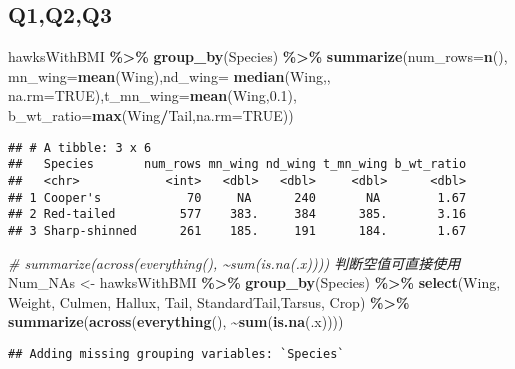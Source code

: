 \documentclass[
]{article}
\newenvironment{Shaded}{\begin{snugshade}}{\end{snugshade}}
\newcommand{\AttributeTok}[1]{\textcolor[rgb]{0.13,0.29,0.53}{#1}}
\newcommand{\CommentTok}[1]{\textcolor[rgb]{0.56,0.35,0.01}{\textit{#1}}}
\newcommand{\ConstantTok}[1]{\textcolor[rgb]{0.56,0.35,0.01}{#1}}
\newcommand{\FloatTok}[1]{\textcolor[rgb]{0.00,0.00,0.81}{#1}}
\newcommand{\FunctionTok}[1]{\textcolor[rgb]{0.13,0.29,0.53}{\textbf{#1}}}
\newcommand{\NormalTok}[1]{#1}
\newcommand{\OtherTok}[1]{\textcolor[rgb]{0.56,0.35,0.01}{#1}}
\newcommand{\SpecialCharTok}[1]{\textcolor[rgb]{0.81,0.36,0.00}{\textbf{#1}}}
\begin{document}
\hypertarget{q1q2q3}{%
\subsection{Q1,Q2,Q3}\label{q1q2q3}}

\begin{Shaded}
\begin{Highlighting}[]
\NormalTok{ hawksWithBMI }\SpecialCharTok{\%\textgreater{}\%} 
  \FunctionTok{group\_by}\NormalTok{(Species) }\SpecialCharTok{\%\textgreater{}\%}
   \FunctionTok{summarize}\NormalTok{(}\AttributeTok{num\_rows=}\FunctionTok{n}\NormalTok{(), }\AttributeTok{mn\_wing=}\FunctionTok{mean}\NormalTok{(Wing),}\AttributeTok{nd\_wing=} \FunctionTok{median}\NormalTok{(Wing,, }\AttributeTok{na.rm=}\ConstantTok{TRUE}\NormalTok{),}\AttributeTok{t\_mn\_wing=}\FunctionTok{mean}\NormalTok{(Wing,}\FloatTok{0.1}\NormalTok{), }\AttributeTok{b\_wt\_ratio=}\FunctionTok{max}\NormalTok{(Wing}\SpecialCharTok{/}\NormalTok{Tail,}\AttributeTok{na.rm=}\ConstantTok{TRUE}\NormalTok{))}
\end{Highlighting}
\end{Shaded}

\begin{verbatim}
## # A tibble: 3 x 6
##   Species       num_rows mn_wing nd_wing t_mn_wing b_wt_ratio
##   <chr>            <int>   <dbl>   <dbl>     <dbl>      <dbl>
## 1 Cooper's            70     NA      240       NA        1.67
## 2 Red-tailed         577    383.     384      385.       3.16
## 3 Sharp-shinned      261    185.     191      184.       1.67
\end{verbatim}

\begin{Shaded}
\begin{Highlighting}[]
\CommentTok{\# summarize(across(everything(), \textasciitilde{}sum(is.na(.x)))) 判断空值可直接使用}
\NormalTok{Num\_NAs }\OtherTok{\textless{}{-}}\NormalTok{ hawksWithBMI }\SpecialCharTok{\%\textgreater{}\%} \FunctionTok{group\_by}\NormalTok{(Species) }\SpecialCharTok{\%\textgreater{}\%} \FunctionTok{select}\NormalTok{(Wing, Weight, Culmen, Hallux, Tail, StandardTail,Tarsus, Crop) }\SpecialCharTok{\%\textgreater{}\%} \FunctionTok{summarize}\NormalTok{(}\FunctionTok{across}\NormalTok{(}\FunctionTok{everything}\NormalTok{(), }\SpecialCharTok{\textasciitilde{}}\FunctionTok{sum}\NormalTok{(}\FunctionTok{is.na}\NormalTok{(.x))))}
\end{Highlighting}
\end{Shaded}

\begin{verbatim}
## Adding missing grouping variables: `Species`
\end{verbatim}
\end{document}
